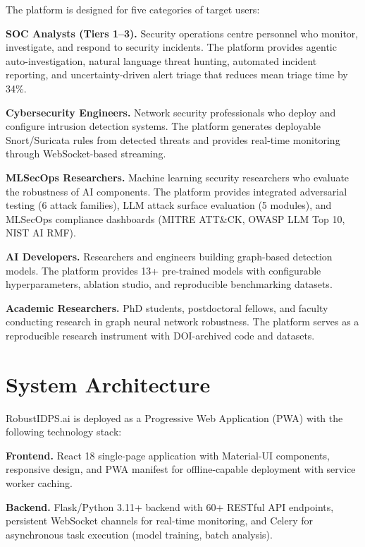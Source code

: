 The platform is designed for five categories of target users:

\noindent\textbf{SOC Analysts (Tiers 1--3).} Security operations centre personnel who monitor, investigate, and respond to security incidents. The platform provides agentic auto-investigation, natural language threat hunting, automated incident reporting, and uncertainty-driven alert triage that reduces mean triage time by 34\%.

\noindent\textbf{Cybersecurity Engineers.} Network security professionals who deploy and configure intrusion detection systems. The platform generates deployable Snort/Suricata rules from detected threats and provides real-time monitoring through WebSocket-based streaming.

\noindent\textbf{MLSecOps Researchers.} Machine learning security researchers who evaluate the robustness of AI components. The platform provides integrated adversarial testing (6 attack families), LLM attack surface evaluation (5 modules), and MLSecOps compliance dashboards (MITRE ATT\&CK, OWASP LLM Top 10, NIST AI RMF).

\noindent\textbf{AI Developers.} Researchers and engineers building graph-based detection models. The platform provides 13+ pre-trained models with configurable hyperparameters, ablation studio, and reproducible benchmarking datasets.

\noindent\textbf{Academic Researchers.} PhD students, postdoctoral fellows, and faculty conducting research in graph neural network robustness. The platform serves as a reproducible research instrument with DOI-archived code and datasets.


\section{System Architecture}
\label{sec:system_arch}

RobustIDPS.ai is deployed as a Progressive Web Application (PWA) with the following technology stack:

\noindent\textbf{Frontend.} React 18 single-page application with Material-UI components, responsive design, and PWA manifest for offline-capable deployment with service worker caching.

\noindent\textbf{Backend.} Flask/Python 3.11+ backend with 60+ RESTful API endpoints, persistent WebSocket channels for real-time monitoring, and Celery for asynchronous task execution (model training, batch analysis).

